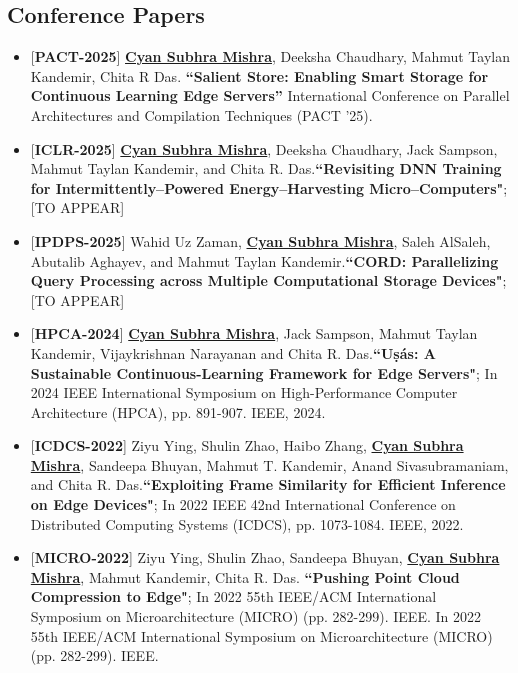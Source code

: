 \documentclass[letterpaper,11pt]{article}
\begin{document}
\subsection*{Conference Papers}
\begin{itemize}

\item \small{[\textbf{PACT-2025}] \textbf{\underline{Cyan Subhra Mishra}}, Deeksha Chaudhary, Mahmut Taylan Kandemir, Chita R Das. \textbf{``Salient Store: Enabling Smart Storage for Continuous Learning Edge Servers''} International Conference on Parallel Architectures and Compilation Techniques (PACT '25).}

\item \small{[\textbf{ICLR-2025}]  \textbf{\underline{Cyan Subhra Mishra}}, Deeksha Chaudhary, Jack Sampson, Mahmut Taylan Kandemir, and Chita R. Das.\textbf{``Revisiting DNN Training for Intermittently--Powered Energy--Harvesting Micro--Computers"}; [TO APPEAR]}

\item \small{[\textbf{IPDPS-2025}]  Wahid Uz Zaman, \textbf{\underline{Cyan Subhra Mishra}}, Saleh AlSaleh, Abutalib Aghayev, and Mahmut Taylan Kandemir.\textbf{``CORD: Parallelizing Query Processing across Multiple Computational Storage Devices"}; [TO APPEAR]}


\item \small{[\textbf{HPCA-2024}]  \textbf{\underline{Cyan Subhra Mishra}}, Jack Sampson, Mahmut Taylan Kandemir, Vijaykrishnan Narayanan and Chita R. Das.\textbf{``U\d{s}\'{a}s: A Sustainable Continuous-Learning Framework for  Edge Servers"};  In 2024 IEEE International Symposium on High-Performance Computer Architecture (HPCA), pp. 891-907. IEEE, 2024.}

\item \small{[\textbf{ICDCS-2022}] Ziyu Ying, Shulin Zhao, Haibo Zhang, \textbf{\underline{Cyan Subhra Mishra}}, Sandeepa Bhuyan, Mahmut T. Kandemir, Anand Sivasubramaniam, and Chita R. Das.\textbf{``Exploiting Frame Similarity for Efficient Inference on Edge Devices"};  In 2022 IEEE 42nd International Conference on Distributed Computing Systems (ICDCS), pp. 1073-1084. IEEE, 2022.}

\item \small{[\textbf{MICRO-2022}] Ziyu Ying, Shulin Zhao, Sandeepa Bhuyan, \textbf{\underline{Cyan Subhra Mishra}}, Mahmut Kandemir, Chita R. Das. \textbf{``Pushing Point Cloud Compression to Edge"}; In 2022 55th IEEE/ACM International Symposium on Microarchitecture (MICRO) (pp. 282-299). IEEE. In 2022 55th IEEE/ACM International Symposium on Microarchitecture (MICRO) (pp. 282-299). IEEE.}
    

\end{itemize}
\end{document}
